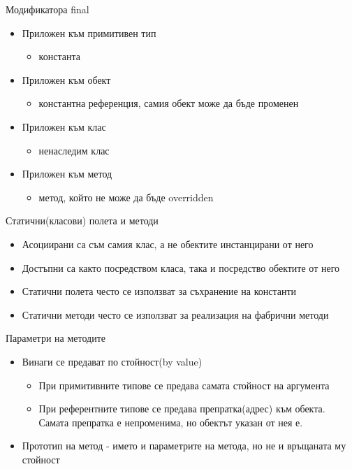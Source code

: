 \documentclass{beamer}
\begin{document}
\begin{frame}{Модификатора final}
  \transdissolve
  \begin{itemize}
  \item Приложен към примитивен тип
    \begin{itemize}
      \item константа \pause
    \end{itemize}
  \item Приложен към обект
    \begin{itemize}
    \item константна референция, самия обект
      може да бъде променен \pause
    \end{itemize}
  \item Приложен към клас
    \begin{itemize}
    \item ненаследим клас \pause
    \end{itemize}
  \item Приложен към метод
    \begin{itemize}
    \item метод, който не
      може да бъде overridden
    \end{itemize}

  \end{itemize}
\end{frame}

\begin{frame}{Статични(класови) полета и методи}
  \transdissolve
  \begin{itemize}
  \item Асоциирани са съм самия клас, а не
    обектите инстанцирани от него \pause
  \item Достъпни са както посредством класа,
    така и посредство обектите от него \pause
  \item Статични полета често се използват за
    съхранение на константи \pause
  \item Статични методи често се използват за
    реализация на фабрични методи
  \end{itemize}
\end{frame}

\begin{frame}{Параметри на методите}
  \transdissolve
  \begin{itemize}
  \item Винаги се предават по стойност(by value)
    \begin{itemize}
    \item При примитивните типове се предава самата стойност на
      аргумента
    \item При референтните типове се предава препратка(адрес) към
      обекта. Самата препратка е непроменима, но обектът указан от
      нея е.
    \end{itemize}
  \item Прототип на метод - името и параметрите на метода, но не и
    връщаната му стойност
  \end{itemize}
\end{frame}
\end{document}
